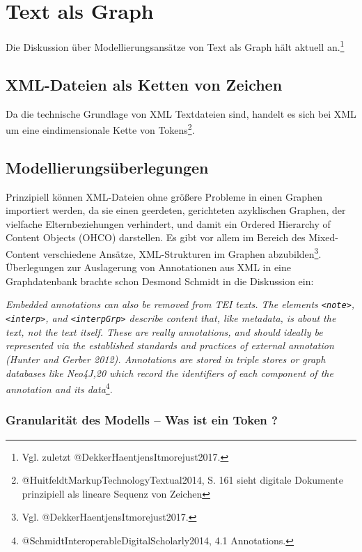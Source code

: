 \documentclass[ngerman,]{scrreprt}
\begin{document}
\section{Text als Graph}\label{text-als-graph}

Die Diskussion über Modellierungsansätze von Text als Graph hält aktuell an.\footnote{Vgl. zuletzt @DekkerHaentjensItmorejust2017.}

\subsection{XML-Dateien als Ketten von Zeichen}\label{xml-dateien-als-ketten-von-zeichen}

Da die technische Grundlage von XML Textdateien sind, handelt es sich bei XML um eine eindimensionale Kette von Tokens\footnote{@HuitfeldtMarkupTechnologyTextual2014, S. 161 sieht digitale Dokumente prinzipiell als lineare Sequenz von Zeichen}.

\subsection{Modellierungsüberlegungen}\label{modellierungsuxfcberlegungen}

Prinzipiell können XML-Dateien ohne größere Probleme in einen Graphen importiert werden, da sie einen geerdeten, gerichteten azyklischen Graphen, der vielfache Elternbeziehungen verhindert, und damit ein Ordered Hierarchy of Content Objects (OHCO) darstellen. Es gibt vor allem im Bereich des Mixed-Content verschiedene Ansätze, XML-Strukturen im Graphen abzubilden\footnote{Vgl. @DekkerHaentjensItmorejust2017.}. Überlegungen zur Auslagerung von Annotationen aus XML in eine Graphdatenbank brachte schon Desmond Schmidt in die Diskussion ein:

\emph{Embedded annotations can also be removed from TEI texts. The elements \texttt{\textless{}note\textgreater{}}, \texttt{\textless{}interp\textgreater{}}, and \texttt{\textless{}interpGrp\textgreater{}} describe content that, like metadata, is about the text, not the text itself. These are really annotations, and should ideally be represented via the established standards and practices of external annotation (Hunter and Gerber 2012). Annotations are stored in triple stores or graph databases like Neo4J,20 which record the identifiers of each component of the annotation and its data}\footnote{@SchmidtInteroperableDigitalScholarly2014, 4.1 Annotations.}.

\subsubsection{Granularität des Modells -- Was ist ein Token ?}\label{granularituxe4t-des-modells-was-ist-ein-token}
\end{document}
